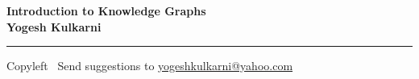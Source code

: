 
\graphicspath{{images/}}

\footnotesize


\begin{center}
\Large{\textbf{Introduction to Knowledge Graphs\\ Yogesh Kulkarni}}  
\end{center}

\begin{multicols}{2}


\end{multicols}

\rule{\linewidth}{0.25pt}
\scriptsize
Copyleft \textcopyleft\  Send suggestions to 
\href{http://www.yogeshkulkarni.com}{yogeshkulkarni@yahoo.com}


